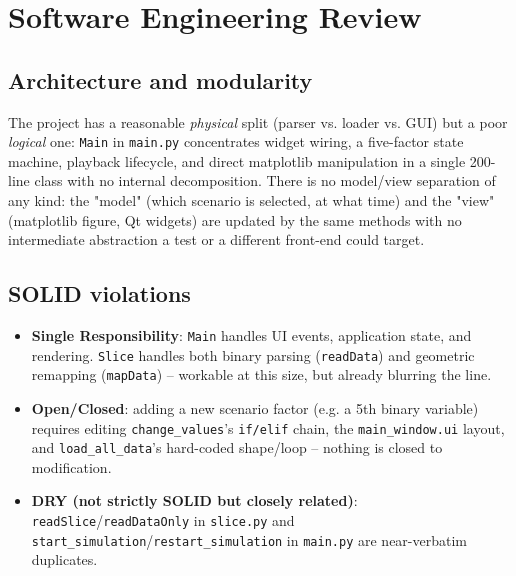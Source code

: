 \documentclass[11pt,a4paper]{report}
\begin{document}
\chapter{Software Engineering Review}

\section{Architecture and modularity}
\begin{interpbox}
The project has a reasonable \emph{physical} split (parser vs. loader vs. GUI) but a poor
\emph{logical} one: \texttt{Main} in \texttt{main.py} concentrates widget wiring, a five-factor state
machine, playback lifecycle, and direct matplotlib manipulation in a single 200-line class with no
internal decomposition. There is no model/view separation of any kind: the "model" (which scenario is
selected, at what time) and the "view" (matplotlib figure, Qt widgets) are updated by the same methods
with no intermediate abstraction a test or a different front-end could target.
\end{interpbox}

\section{SOLID violations}
\label{sec:solid}
\begin{itemize}[nosep]
\item \textbf{Single Responsibility}: \texttt{Main} handles UI events, application state, and
rendering. \texttt{Slice} handles both binary parsing (\texttt{readData}) and geometric remapping
(\texttt{mapData}) -- workable at this size, but already blurring the line.
\item \textbf{Open/Closed}: adding a new scenario factor (e.g. a 5th binary variable) requires editing
\texttt{change\_values}'s \texttt{if/elif} chain, the \texttt{main\_window.ui} layout, and
\texttt{load\_all\_data}'s hard-coded shape/loop -- nothing is closed to modification.
\item \textbf{DRY (not strictly SOLID but closely related)}: \texttt{readSlice}/\texttt{readDataOnly}
in \texttt{slice.py} and \texttt{start\_simulation}/\texttt{restart\_simulation} in \texttt{main.py}
are near-verbatim duplicates.
\end{itemize}
\end{document}
